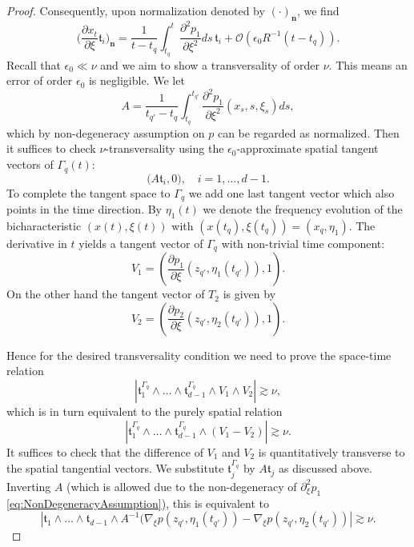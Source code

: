 \documentclass{amsart}
\theoremstyle{definition}
\begin{document}
\begin{proof}
 Consequently, upon normalization denoted by $(\cdot)_{\mathbf{n}}$, we find
\begin{equation*}
\big( \frac{\partial x_t}{\partial \xi} \mathfrak{t}_i \big)_{\mathbf{n}} = \frac{1}{t-t_q} \int_{t_q}^{t} \frac{\partial^2 p_1}{\partial \xi^2}  ds \, \mathfrak{t}_i + \mathcal{O}(\epsilon_0 R^{-1} (t-t_q)).
\end{equation*}
Recall that $\epsilon_0 \ll \nu$ and we aim to show a transversality of order $\nu$. This means an error of order $\epsilon_0$ is negligible. We let
\begin{equation*}
A = \frac{1}{t_{q'}-t_q} \int_{t_q}^{t_{q'}} \frac{\partial^2 p_1}{\partial \xi^2}(x_s,s,\xi_s) ds,
\end{equation*}
which by non-degeneracy assumption on $p$ can be regarded as normalized.
Then it suffices to check $\nu$-transversality using the $\epsilon_0$-approximate spatial tangent vectors of $\Gamma_{q}(t)$:
\begin{equation*}
\big( A \mathfrak{t}_i, 0), \quad i =1,\ldots,d-1.
\end{equation*}
To complete the tangent space to $\Gamma_q$ we add one last  tangent vector which also points in the time direction. By $\eta_1(t)$ we denote the frequency evolution of the bicharacteristic $(x(t),\xi(t))$ with $(x(t_q),\xi(t_q)) = (x_q,\eta_1)$.
The derivative in $t$ yields a tangent vector of $\Gamma_{q}$ with non-trivial time component:
\begin{equation*}
V_1 = (\frac{\partial p_1}{\partial \xi}(z_{q'},\eta_1(t_{q'})),1).
\end{equation*}
On the other hand the tangent vector of $T_2$ is given by
\begin{equation*}
V_2 = (\frac{\partial p_2}{\partial \xi} (z_{q'},\eta_2(t_{q'})), 1).
\end{equation*}

Hence for the desired transversality condition we need to prove the space-time relation 
\begin{equation}
\label{eq:nuTransversality}
|\mathfrak{t}_1^{\Gamma_q} \wedge \ldots \wedge \mathfrak{t}_{d-1}^{\Gamma_q} \wedge V_1 \wedge V_2 | \gtrsim \nu,
\end{equation}
which is in turn  equivalent to the purely spatial relation
\[
|\mathfrak{t}_1^{\Gamma_q} \wedge \ldots \wedge \mathfrak{t}_{d-1}^{\Gamma_q} \wedge (V_1-V_2) | \gtrsim \nu.
\]
It suffices to check that the difference of $V_1$ and $V_2$ is quantitatively transverse to the spatial tangential vectors. We substitute $\mathfrak{t}_j^{\Gamma_q}$ 
by $ A \mathfrak{t}_j$ as discussed above. Inverting $A$ (which is allowed due to the non-degeneracy of $\partial^2_{\xi} p_1$ \eqref{eq:NonDegeneracyAssumption}), this is equivalent to
\begin{equation}
\label{eq:TransversalityAuxI}
| \mathfrak{t}_1 \wedge \ldots \wedge \mathfrak{t}_{d-1} \wedge A^{-1} \big( \nabla_{\xi} p(z_{q'},\eta_1(t_{q'})) - \nabla_{\xi} p(z_{q'},\eta_2(t_{q'})) | \gtrsim \nu.
\end{equation}


\end{proof}
\end{document}
